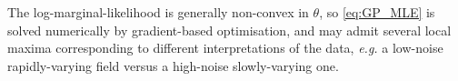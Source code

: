 \begin{remark}
	The log-marginal-likelihood is generally non-convex in $\theta$, so \eqref{eq:GP_MLE} is solved numerically by gradient-based optimisation, and may admit several local maxima corresponding to different interpretations of the data, \textit{e.g.} a low-noise rapidly-varying field versus a high-noise slowly-varying one.
\end{remark}
